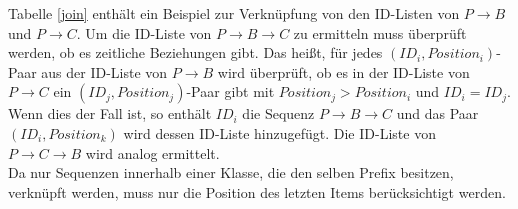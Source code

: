 Tabelle \ref{join} enthält ein Beispiel zur Verknüpfung von den ID-Listen von $P\rightarrow B$ und $P\rightarrow C$. Um die ID-Liste von $P\rightarrow B\rightarrow C$ zu ermitteln muss überprüft werden, ob es zeitliche Beziehungen gibt. Das heißt, für jedes $(ID_i,Position_i)$-Paar aus der ID-Liste von $P\rightarrow B$ wird überprüft, ob es in der ID-Liste von $P\rightarrow C$ ein $(ID_j,Position_j)$-Paar gibt mit $Position_j > Position_i$ und $ID_i = ID_j$. Wenn dies der Fall ist, so enthält $ID_i$ die Sequenz $P\rightarrow B\rightarrow C$ und das Paar $(ID_i, Position_k)$ wird dessen ID-Liste hinzugefügt. Die ID-Liste von $P\rightarrow C\rightarrow B$ wird analog ermittelt.\\
Da nur Sequenzen innerhalb einer Klasse, die den selben Prefix besitzen, verknüpft werden, muss nur die Position des letzten Items berücksichtigt werden.

